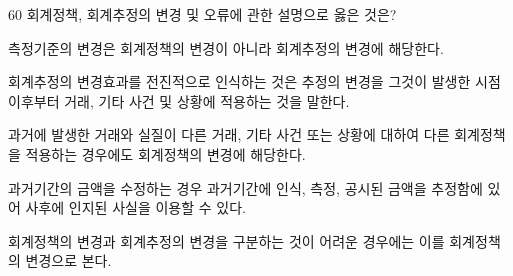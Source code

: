 \begin{question}{60}
회계정책, 회계추정의 변경 및 오류에 관한 설명으로 옳은 것은?
\begin{choices}
  \item 측정기준의 변경은 회계정책의 변경이 아니라 회계추정의 변경에 해당한다.
  \item 회계추정의 변경효과를 전진적으로 인식하는 것은 추정의 변경을 그것이 발생한 시점 이후부터 거래, 기타 사건 및 상황에 적용하는 것을 말한다.
  \item 과거에 발생한 거래와 실질이 다른 거래, 기타 사건 또는 상황에 대하여 다른 회계정책을 적용하는 경우에도 회계정책의 변경에 해당한다.
  \item 과거기간의 금액을 수정하는 경우 과거기간에 인식, 측정, 공시된 금액을 추정함에 있어 사후에 인지된 사실을 이용할 수 있다.
  \item 회계정책의 변경과 회계추정의 변경을 구분하는 것이 어려운 경우에는 이를 회계정책의 변경으로 본다.
\end{choices}
\end{question}
